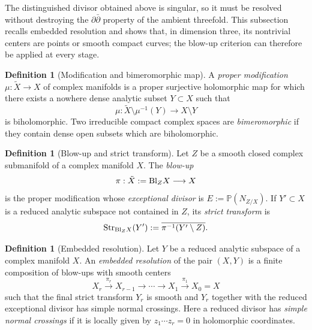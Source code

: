 \documentclass[11pt]{amsart}
\numberwithin{equation}{section}
\def\Bl{{\rm Bl}}
\def\Str{{\rm Str}}
\theoremstyle{plain}
\theoremstyle{definition}
\newtheorem{defn}[thm]{Definition}
\begin{document}
The distinguished divisor obtained above is singular, so it must be resolved
without destroying the $\partial\bar\partial$ property of the ambient
threefold.  This subsection recalls embedded resolution and shows that, in
dimension three, its nontrivial centers are points or smooth compact curves;
the blow-up criterion can therefore be applied at every stage.

\begin{defn}[Modification and bimeromorphic map]\label{modification-definition}
A \emph{proper modification} $\mu:\tilde{X}\to X$ of complex manifolds is
a proper surjective holomorphic map for which there exists a nowhere dense
analytic subset $Y\subset X$ such that
\[
 \mu:\tilde{X}\setminus\mu^{-1}(Y)\longrightarrow X\setminus Y
\]
is biholomorphic.  Two irreducible compact complex spaces are
\emph{bimeromorphic} if they contain dense open subsets which are
biholomorphic.
\end{defn}

\begin{defn}[Blow-up and strict transform]\label{blowup-definition}
Let $Z$ be a smooth closed complex submanifold of a complex manifold $X$.
The \emph{blow-up}
\[
 \pi:\tilde{X}:=\Bl_Z X\longrightarrow X
\]
is the proper modification whose \emph{exceptional divisor} is
$E:=\mathbb P(N_{Z/X})$.  If $Y'\subset X$ is a reduced analytic subspace not contained
in $Z$, its \emph{strict transform} is
\begin{equation*}%
 \Str_{\Bl_Z X}(Y'):=\overline{\pi^{-1}(Y'\setminus Z)}.
\end{equation*}
\end{defn}

\begin{defn}[Embedded resolution]\label{embedded-resolution-definition}
Let $Y$ be a reduced analytic subspace of a complex manifold $X$.  An
\emph{embedded resolution} of the pair $(X,Y)$ is a finite composition of
blow-ups with smooth centers
\begin{equation}\label{embedded-resolution-sequence}
 X_r\xrightarrow{\pi_r}X_{r-1}\longrightarrow\cdots
 \longrightarrow X_1\xrightarrow{\pi_1}X_0=X
\end{equation}
such that the final strict transform $Y_r$ is smooth and $Y_r$ together with
the reduced exceptional divisor has simple normal crossings.  Here a reduced
divisor has \emph{simple normal crossings} if it is locally given by
$z_1\cdots z_r=0$ in holomorphic coordinates.
\end{defn}
\end{document}
